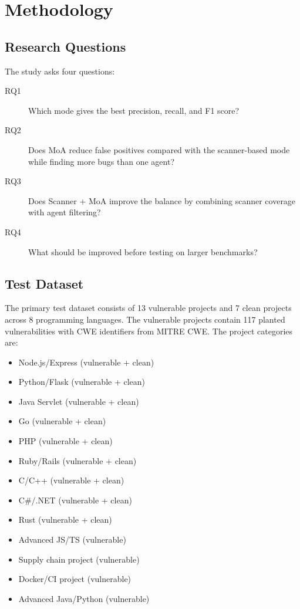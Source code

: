\documentclass[sigconf,nonacm]{acmart}
\begin{document}
\section{Methodology}
\subsection{Research Questions}
The study asks four questions:

\begin{description}
  \item[RQ1] Which mode gives the best precision, recall, and F1 score?
  \item[RQ2] Does MoA reduce false positives compared with the scanner-based mode while finding more bugs than one agent?
  \item[RQ3] Does Scanner + MoA improve the balance by combining scanner coverage with agent filtering?
  \item[RQ4] What should be improved before testing on larger benchmarks?
\end{description}

\subsection{Test Dataset}

The primary test dataset consists of 13 vulnerable projects and 7 clean projects across 8 programming languages. The vulnerable projects contain 117 planted vulnerabilities with CWE identifiers from MITRE CWE. The project categories are:

\begin{itemize}
  \item Node.js/Express (vulnerable + clean)
  \item Python/Flask (vulnerable + clean)
  \item Java Servlet (vulnerable + clean)
  \item Go (vulnerable + clean)
  \item PHP (vulnerable + clean)
  \item Ruby/Rails (vulnerable + clean)
  \item C/C++ (vulnerable + clean)
  \item C\#/.NET (vulnerable + clean)
  \item Rust (vulnerable + clean)
  \item Advanced JS/TS (vulnerable)
  \item Supply chain project (vulnerable)
  \item Docker/CI project (vulnerable)
  \item Advanced Java/Python (vulnerable)
\end{itemize}
\end{document}
